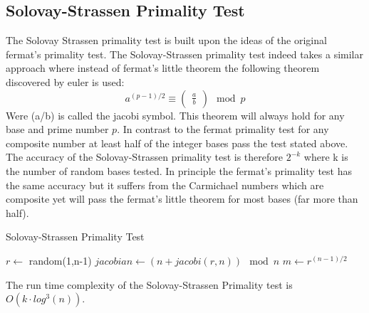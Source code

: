 \documentclass[compressed,final,notitlepage,narroweqnarray,inline,twoside,]{ieee}
\begin{document}
\subsection{Solovay-Strassen Primality Test}
The Solovay Strassen primality test \cite{SS} is built upon the ideas of the original fermat’s primality test. The Solovay-Strassen primality test indeed takes a similar approach where instead of fermat’s little theorem the following theorem discovered by euler is used:
\begin{equation}
a^{(p-1)/2} \equiv \begin{pmatrix}\frac{a}{b}\end{pmatrix} \mod p
\end{equation}
Were (a/b) is called the jacobi symbol. This theorem will always hold for any base and prime number $p$. In contrast to the fermat primality test for any composite  number at least half of the integer bases pass the test stated above. The accuracy of the Solovay-Strassen primality test is therefore $2^{-k}$ where k is the number of random bases tested. In principle the fermat’s primality test has the same accuracy but it suffers from the Carmichael numbers which are composite yet will pass the fermat’s little theorem for most bases (far more than half).  
\begin{algorithm}[ht]
 \caption{Solovay-Strassen Primality Test}
 {
 	\;
 }
 {
	$r \longleftarrow$ random(1,n-1) \;
	$jacobian \longleftarrow (n+jacobi(r,n)) \mod n$ \;
	$m \longleftarrow r^{(n-1)/2}$ \;
	{
		\;
	}
 }
 \;
\end{algorithm}
The run time complexity of the Solovay-Strassen Primality test is $O(k \cdot log^3(n))$. 
\end{document}
